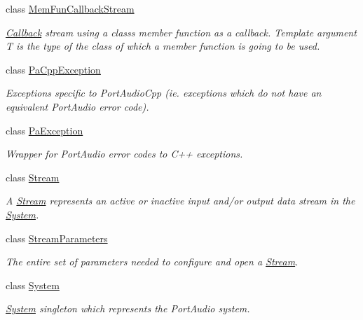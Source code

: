 \begin{DoxyCompactItemize}
class \hyperlink{classportaudio_1_1_mem_fun_callback_stream}{Mem\+Fun\+Callback\+Stream}
\begin{DoxyCompactList}\small\item\em \hyperlink{class_callback}{Callback} stream using a class\textquotesingle{}s member function as a callback. Template argument T is the type of the class of which a member function is going to be used. \end{DoxyCompactList}\item 
class \hyperlink{classportaudio_1_1_pa_cpp_exception}{Pa\+Cpp\+Exception}
\begin{DoxyCompactList}\small\item\em Exceptions specific to Port\+Audio\+Cpp (ie. exceptions which do not have an equivalent Port\+Audio error code). \end{DoxyCompactList}\item 
class \hyperlink{classportaudio_1_1_pa_exception}{Pa\+Exception}
\begin{DoxyCompactList}\small\item\em Wrapper for Port\+Audio error codes to C++ exceptions. \end{DoxyCompactList}\item 
class \hyperlink{classportaudio_1_1_stream}{Stream}
\begin{DoxyCompactList}\small\item\em A \hyperlink{classportaudio_1_1_stream}{Stream} represents an active or inactive input and/or output data stream in the \hyperlink{classportaudio_1_1_system}{System}. \end{DoxyCompactList}\item 
class \hyperlink{classportaudio_1_1_stream_parameters}{Stream\+Parameters}
\begin{DoxyCompactList}\small\item\em The entire set of parameters needed to configure and open a \hyperlink{classportaudio_1_1_stream}{Stream}. \end{DoxyCompactList}\item 
class \hyperlink{classportaudio_1_1_system}{System}
\begin{DoxyCompactList}\small\item\em \hyperlink{classportaudio_1_1_system}{System} singleton which represents the Port\+Audio system. \end{DoxyCompactList}\end{DoxyCompactItemize}
